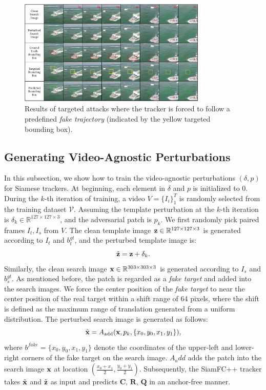 \documentclass[journal]{IEEEtran}
\begin{document}
\begin{figure}[t]
  \centering
  \includegraphics[width=0.8\textwidth]{images_imperceptible/vis_v6.pdf}
  \caption{Results of targeted attacks where the tracker is forced to follow a predefined \textit{fake trajectory} (indicated by the yellow targeted bounding box).}
  \label{fig:vis}
\end{figure}

\subsection{Generating Video-Agnostic Perturbations}\label{generate}

In this subsection, we show how to train the video-agnostic perturbations $(\delta, p)$ for Siamese trackers. At beginning, each element in $\delta$ and $p$ is initialized to 0.
During the $k$-th iteration of training, a video $V=\{I_i\}_1^T$ is randomly selected from the training dataset $\mathcal V$. 
Assuming the template perturbation at the $k$-th iteration is $\delta_k \in \mathbb{R}^{127\times 127 \times 3}$, and the adversarial patch is $p_k$. 
We first randomly pick paired frames $I_t, I_s$ from $V$. The clean template image $\textbf z\in \mathbb{R}^{127\times 127 \times 3}$ is generated according to $I_t$ and $b^{gt}_t$, and the perturbed template image is:
\begin{equation}
\tilde {\textbf z} = \textbf z + \delta_k.
\end{equation}
Similarly, the clean search image $\textbf x \in \mathbb{R}^{303\times 303 \times 3}$ is generated according to $I_s$ and $b^{gt}_s$.
As mentioned before, the patch is regarded as a \textit{fake target} and added into the search images. We force the center position of the \textit{fake target} to near the center position of the real target within a shift range of 64 pixels, where the shift is defined as the maximum range of translation generated from a uniform distribution.
The perturbed search image is generated as follows:
\begin{equation}
\tilde{\textbf x} = A_{\text{add}}(\textbf x, p_k, \{x_0, y_0, x_1, y_1\}),
\end{equation}
where $ b^{fake} = \{x_0, y_0, x_1, y_1\}$ denote the coordinates of the upper-left and lower-right corners of the fake target on the search image. 
$A_add$ adds the patch into the search image $\textbf x$ at location $(\frac{x_0+x_1}{2},\frac{y_0+y_1}{2})$. Subsequently, the SiamFC++ tracker takes $\tilde {\textbf x}$ and $\tilde{\textbf z}$ as input and predicts $\textbf{C, R, Q}$ in an anchor-free manner.
\end{document}
